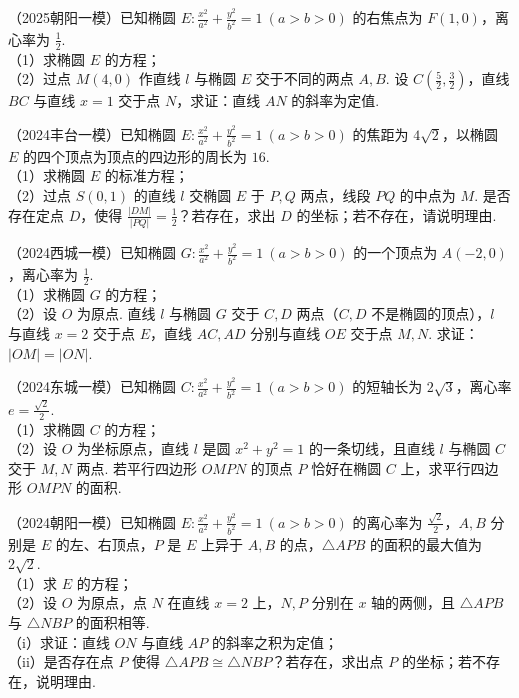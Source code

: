 \begin{example} %
（2025朝阳一模）已知椭圆 $E:\frac{x^2}{a^2}+\frac{y^2}{b^2}=1\ (a>b>0)$ 的右焦点为 $F(1,0)$，离心率为 $\frac{1}{2}$.\\
（1）求椭圆 $E$ 的方程；\\
（2）过点 $M(4,0)$ 作直线 $l$ 与椭圆 $E$ 交于不同的两点 $A,B$. 设 $C\left(\frac{5}{2},\frac{3}{2}\right)$，直线 $BC$ 与直线 $x=1$ 交于点 $N$，求证：直线 $AN$ 的斜率为定值.
\end{example}

\begin{example} %
（2024丰台一模）已知椭圆 $E:\frac{x^2}{a^2}+\frac{y^2}{b^2}=1\ (a>b>0)$ 的焦距为 $4\sqrt{2}$，以椭圆 $E$ 的四个顶点为顶点的四边形的周长为 $16$.\\
（1）求椭圆 $E$ 的标准方程；\\
（2）过点 $S(0,1)$ 的直线 $l$ 交椭圆 $E$ 于 $P,Q$ 两点，线段 $PQ$ 的中点为 $M$. 是否存在定点 $D$，使得 $\frac{\lvert DM\rvert}{\lvert PQ\rvert}=\frac{1}{2}$？若存在，求出 $D$ 的坐标；若不存在，请说明理由.
\end{example}

\begin{example} %
（2024西城一模）已知椭圆 $G:\frac{x^2}{a^2}+\frac{y^2}{b^2}=1\ (a>b>0)$ 的一个顶点为 $A(-2,0)$，离心率为 $\frac{1}{2}$.\\
（1）求椭圆 $G$ 的方程；\\
（2）设 $O$ 为原点. 直线 $l$ 与椭圆 $G$ 交于 $C,D$ 两点（$C,D$ 不是椭圆的顶点），$l$ 与直线 $x=2$ 交于点 $E$，直线 $AC,AD$ 分别与直线 $OE$ 交于点 $M,N$. 求证：$\lvert OM\rvert=\lvert ON\rvert$.
\end{example}

\begin{example} %
（2024东城一模）已知椭圆 $C:\frac{x^2}{a^2}+\frac{y^2}{b^2}=1\ (a>b>0)$ 的短轴长为 $2\sqrt{3}$，离心率 $e=\frac{\sqrt{2}}{2}$.\\
（1）求椭圆 $C$ 的方程；\\
（2）设 $O$ 为坐标原点，直线 $l$ 是圆 $x^2+y^2=1$ 的一条切线，且直线 $l$ 与椭圆 $C$ 交于 $M,N$ 两点. 若平行四边形 $OMPN$ 的顶点 $P$ 恰好在椭圆 $C$ 上，求平行四边形 $OMPN$ 的面积.
\end{example}

\begin{example} %
（2024朝阳一模）已知椭圆 $E:\frac{x^2}{a^2}+\frac{y^2}{b^2}=1\ (a>b>0)$ 的离心率为 $\frac{\sqrt{2}}{2}$，$A,B$ 分别是 $E$ 的左、右顶点，$P$ 是 $E$ 上异于 $A,B$ 的点，$\triangle APB$ 的面积的最大值为 $2\sqrt{2}$.\\
（1）求 $E$ 的方程；\\
（2）设 $O$ 为原点，点 $N$ 在直线 $x=2$ 上，$N,P$ 分别在 $x$ 轴的两侧，且 $\triangle APB$ 与 $\triangle NBP$ 的面积相等.\\
（i）求证：直线 $ON$ 与直线 $AP$ 的斜率之积为定值；\\
（ii）是否存在点 $P$ 使得 $\triangle APB\cong\triangle NBP$？若存在，求出点 $P$ 的坐标；若不存在，说明理由.
\end{example}

